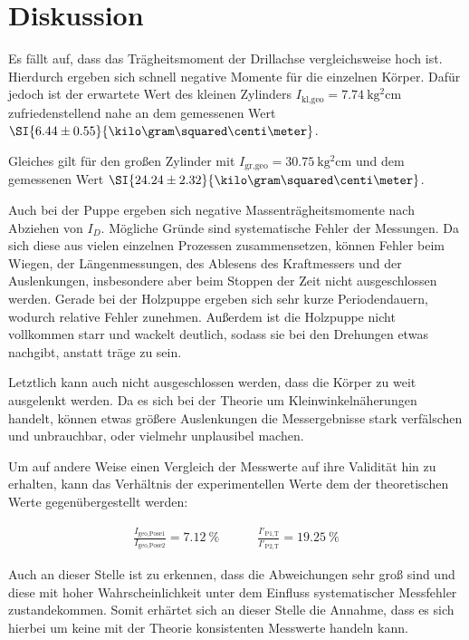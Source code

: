 \section{Diskussion}
\label{sec:Diskussion}

Es fällt auf, dass das Trägheitsmoment der Drillachse vergleichsweise hoch ist.
Hierdurch ergeben sich schnell negative Momente für die einzelnen Körper.
Dafür jedoch ist der erwartete Wert des kleinen Zylinders ${I_\text{kl,geo} = \SI{7.74}{\kilo\gram\squared\centi\meter}}$
zufriedenstellend nahe an dem gemessenen Wert $\SI{6.44\pm0.55}{\kilo\gram\squared\centi\meter}$.

Gleiches gilt für den großen Zylinder mit ${I_\text{gr,geo} = \SI{30.75}{\kilo\gram\squared\centi\meter}}$ und dem
gemessenen Wert $\SI{24.24\pm2.32}{\kilo\gram\squared\centi\meter}$.

Auch bei der Puppe ergeben sich negative Massenträgheitsmomente nach Abziehen von $I_D$.
Mögliche Gründe sind systematische Fehler der Messungen. Da sich diese aus vielen einzelnen Prozessen zusammensetzen,
können Fehler beim Wiegen, der Längenmessungen, des Ablesens des Kraftmessers und der Auslenkungen, insbesondere aber beim Stoppen
der Zeit nicht ausgeschlossen werden. Gerade bei der Holzpuppe ergeben sich sehr kurze Periodendauern, wodurch relative Fehler zunehmen.
Außerdem ist die Holzpuppe nicht vollkommen starr und wackelt deutlich, sodass sie bei den Drehungen etwas nachgibt, anstatt träge zu sein.

Letztlich kann auch nicht ausgeschlossen werden, dass die Körper zu weit ausgelenkt werden. Da es sich bei der Theorie
um Kleinwinkelnäherungen handelt, können etwas größere Auslenkungen die Messergebnisse stark verfälschen und unbrauchbar, oder vielmehr unplausibel machen.

Um auf andere Weise einen Vergleich der Messwerte auf ihre Validität hin zu erhalten, kann das Verhältnis der 
experimentellen Werte dem der theoretischen Werte gegenübergestellt werden: 

\begin{gather}
    \frac{I_\text{geo,Pose1}}{I_\text{geo,Pose2}}=\SI{7.12}{\percent} \quad \quad \quad 
    \frac{I'_\text{P1,T}}{I'_\text{P2,T}}=\SI{19.25}{\percent}
\end{gather}

Auch an dieser Stelle ist zu erkennen, dass die Abweichungen sehr groß sind und diese mit hoher Wahrscheinlichkeit 
unter dem Einfluss systematischer Messfehler zustandekommen. Somit erhärtet sich an dieser Stelle die Annahme, dass es sich 
hierbei um keine mit der Theorie konsistenten Messwerte handeln kann. 